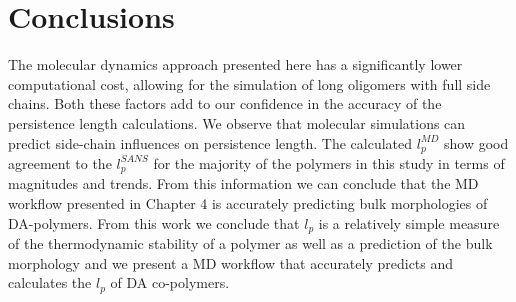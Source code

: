 \section{Conclusions}
The molecular dynamics approach presented here has a significantly lower computational cost, allowing for the simulation of long oligomers with full side chains. Both these factors add to our confidence in the accuracy of the persistence length calculations. We observe that molecular simulations can predict side-chain influences on persistence length. The calculated $l_p^{MD}$ show good agreement to the $l_p^{SANS}$ for the majority of the polymers in this study in terms of magnitudes and trends. From this information we can conclude that the MD workflow presented in Chapter 4 is accurately predicting bulk morphologies of DA-polymers. From this work we conclude that $l_p$ is a relatively simple measure of the thermodynamic stability of a polymer as well as a prediction of the bulk morphology and we present a MD workflow that accurately predicts and calculates the $l_p$ of DA co-polymers. 